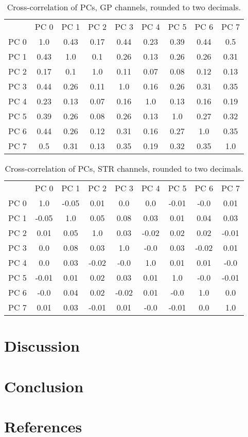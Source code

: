 \documentclass{article}
\begin{document}
\begin{table}[H]
    \centering
    \begin{tabular}{c|c|c|c|c|c|c|c|c}
          & PC 0 & PC 1 & PC 2 & PC 3  & PC 4 & PC 5 & PC 6 & PC 7  \\
     PC 0 & 1.0  & 0.43 & 0.17 & 0.44  & 0.23 & 0.39 & 0.44 & 0.5  \\
     PC 1 & 0.43 & 1.0  & 0.1  & 0.26  & 0.13 & 0.26 & 0.26 & 0.31 \\
     PC 2 & 0.17 & 0.1  & 1.0  & 0.11  & 0.07 & 0.08 & 0.12 & 0.13 \\
     PC 3 & 0.44 & 0.26 & 0.11 & 1.0   & 0.16 & 0.26 & 0.31 & 0.35 \\
     PC 4 & 0.23 & 0.13 & 0.07 & 0.16  & 1.0  & 0.13 & 0.16 & 0.19 \\
     PC 5 & 0.39 & 0.26 & 0.08 & 0.26  & 0.13 & 1.0  & 0.27 & 0.32 \\
     PC 6 & 0.44 & 0.26 & 0.12 & 0.31  & 0.16 & 0.27 & 1.0  & 0.35 \\
     PC 7 & 0.5  & 0.31 & 0.13 & 0.35  & 0.19 & 0.32 & 0.35 & 1.0  \\
    \end{tabular}
    \caption{Cross-correlation of PCs, GP channels, rounded to two decimals.}
    \label{tab:corrcoefGP}
\end{table}

\begin{table}[H]
    \centering
    \begin{tabular}{c|c|c|c|c|c|c|c|c}
          & PC 0  &  PC 1 &  PC 2 &  PC 3 &  PC 4 &  PC 5 &  PC 6 &  PC 7 \\
     PC 0 &  1.0  & -0.05 &  0.01 &  0.0  &  0.0  & -0.01 & -0.0  &  0.01 \\
     PC 1 & -0.05 &  1.0  &  0.05 &  0.08 &  0.03 &  0.01 &  0.04 &  0.03 \\
     PC 2 &  0.01 &  0.05 &  1.0  &  0.03 & -0.02 &  0.02 &  0.02 & -0.01 \\
     PC 3 &  0.0  &  0.08 &  0.03 &  1.0  & -0.0  &  0.03 & -0.02 &  0.01 \\
     PC 4 &  0.0  &  0.03 & -0.02 & -0.0  &  1.0  &  0.01 &  0.01 & -0.0  \\
     PC 5 & -0.01 &  0.01 &  0.02 &  0.03 &  0.01 &  1.0 &  -0.0  & -0.01 \\
     PC 6 & -0.0  &  0.04 &  0.02 & -0.02 &  0.01 & -0.0 &   1.0  &  0.0  \\
     PC 7 &  0.01 &  0.03 & -0.01 &  0.01 & -0.0  & -0.01 &  0.0  &  1.0  \\
    \end{tabular}
    \caption{Cross-correlation of PCs, STR channels, rounded to two decimals.}
    \label{tab:corrcoefSTR}
\end{table}

\newpage
\section{Discussion}

\newpage
\section{Conclusion}

\newpage
\section{References}

\end{document}
